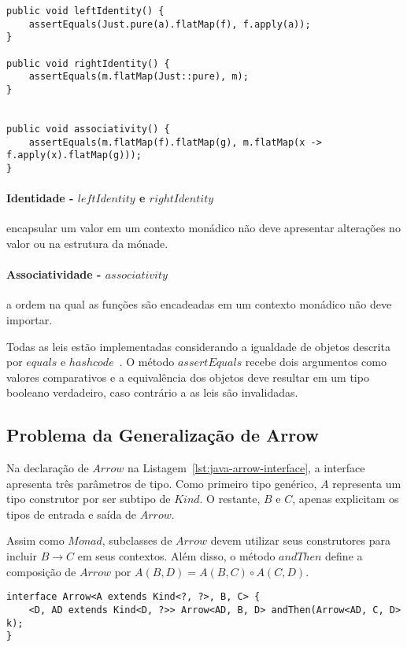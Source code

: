 \documentclass[10pt, conference]{IEEEtran}
\begin{document}
\begin{lstlisting}[caption = {Leis de $Monad$}, label = {lst:java-monad-laws}]
public void leftIdentity() {
	assertEquals(Just.pure(a).flatMap(f), f.apply(a));
}

public void rightIdentity() {
	assertEquals(m.flatMap(Just::pure), m);
}


public void associativity() {
	assertEquals(m.flatMap(f).flatMap(g), m.flatMap(x -> f.apply(x).flatMap(g)));
}
\end{lstlisting}

\paragraph{Identidade - $leftIdentity$ e $rightIdentity$} encapsular um valor em um contexto monádico não deve apresentar alterações no valor ou na estrutura da mónade.

\paragraph{Associatividade - $associativity$} a ordem na qual as funções são encadeadas em um contexto monádico não deve importar.

Todas as leis estão implementadas considerando a igualdade de objetos descrita por $equals$ e $hashcode$~\cite{gosling1995java}. O método $assertEquals$ recebe dois argumentos como valores comparativos e a equivalência dos objetos deve resultar em um tipo booleano verdadeiro, caso contrário a as leis são invalidadas.

\subsection{Problema da Generalização de Arrow}

Na declaração de $Arrow$ na Listagem~\ref{lst:java-arrow-interface}, a interface apresenta três parâmetros de tipo. Como primeiro tipo genérico, $A$ representa um tipo construtor por ser subtipo de $Kind$. O restante, $B$ e $C$, apenas explicitam os tipos de entrada e saída de $Arrow$.

Assim como $Monad$, subclasses de $Arrow$ devem utilizar seus construtores para incluir $B \rightarrow C$ em seus contextos. Além disso, o método $andThen$ define a composição de $Arrow$ por $A(B, D) = A(B, C) \circ A(C, D)$.

\begin{lstlisting}[caption = {Interface $Arrow$}, label = {lst:java-arrow-interface}]
interface Arrow<A extends Kind<?, ?>, B, C> {
	<D, AD extends Kind<D, ?>> Arrow<AD, B, D> andThen(Arrow<AD, C, D> k);
}
\end{lstlisting}
\end{document}

